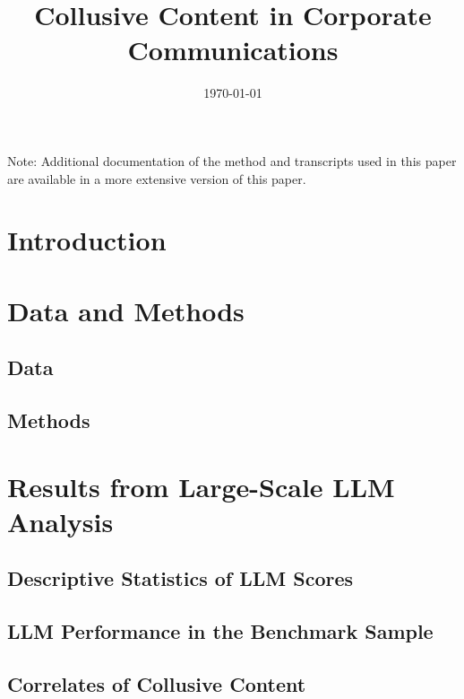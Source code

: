 \documentclass[12pt]{article}
\begin{document}
\title{Collusive Content in Corporate Communications%
}



\date{\today}

\maketitle

\begin{abstract}
{\footnotesize

}
\end{abstract}

Note: Additional documentation of the method and transcripts used in this paper are available in a more extensive version of this paper.

\newpage
\section{\label{sec:intro}Introduction}

\SectionFloatBarrier

\section{\label{sec:data}Data and Methods}
\subsection{Data}

\subsection{Methods}

\FloatBarrier

\section{\label{sec:basic}Results from Large-Scale LLM Analysis}
\subsection{Descriptive Statistics of LLM Scores}

\subsection{LLM Performance in the Benchmark Sample}

\subsection{Correlates of Collusive Content}

\SectionFloatBarrier
\end{document}
